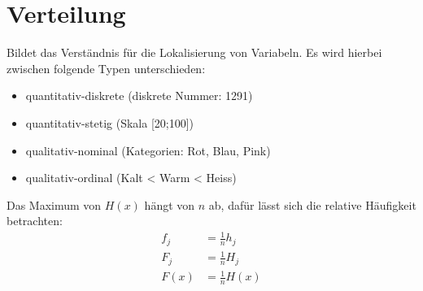 \documentclass[../Main.tex]{subfiles}
\begin{document}
\section{Verteilung}
Bildet das Verständnis für die Lokalisierung von Variabeln.
Es wird hierbei zwischen folgende Typen unterschieden:
\begin{itemize}
    \item quantitativ-diskrete (diskrete Nummer: 1291)
    \item quantitativ-stetig (Skala [20;100])
    \item qualitativ-nominal (Kategorien: Rot, Blau, Pink)
    \item qualitativ-ordinal (Kalt < Warm < Heiss)
\end{itemize}
Das Maximum von \(H(x)\) hängt von \(n\) ab, dafür lässt sich
die relative Häufigkeit betrachten:
\begin{equation}
    \begin{split}
        f_j &= \frac{1}{n}h_j \\
        F_j &= \frac{1}{n}H_j \\
        F(x) &= \frac{1}{n}H(x)
    \end{split}
\end{equation}
\end{document}
